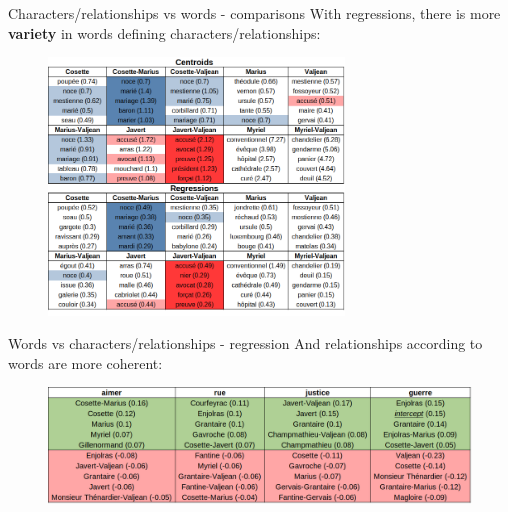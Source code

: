 \documentclass[10pt]{beamer}
\newcommand{\imp}[1]{\textbf{\color{cyan}#1}}
\begin{document}
	
	\begin{frame}{Characters/relationships vs words - comparisons}
		With regressions, there is more \imp{variety} in words defining characters/relationships:
		\vspace{-0.2cm}
		\begin{figure}
			\centering
			\includegraphics[width=0.7\textwidth]{img/reg_vs_word.png}
		\end{figure}
	\end{frame}
	
	
	\begin{frame}{Words vs characters/relationships - regression}
		And relationships according to words are more coherent:
		\vspace{-0.2cm}
		\begin{figure}
			\centering
			\includegraphics[width=\textwidth]{img/word_vs_reg.png}
		\end{figure}
	\end{frame}
	
	
\end{document}
